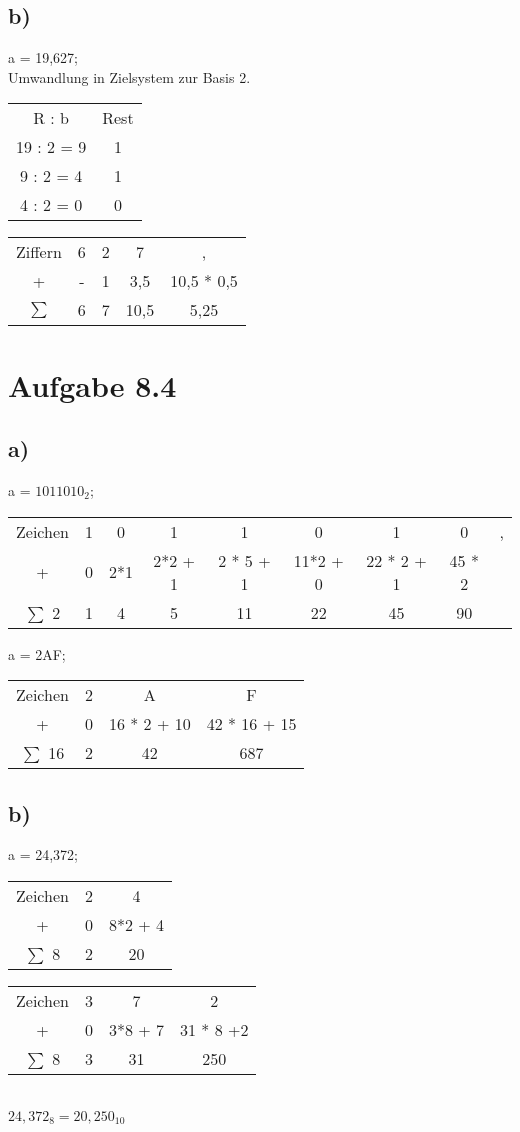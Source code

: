 \documentclass{article}
\begin{document}
	\subsection*{b)}
	a = 19,627; \\
	Umwandlung in Zielsystem zur Basis 2. \\
	\begin{tabular}[h]{c|c}
		R : b & Rest \\
		19 : 2 = 9 & 1 \\
		9 : 2 = 4 & 1 \\
		4 : 2 = 0 & 0
	\end{tabular}
	\begin{tabular}[h]{c|c|c|c|c}
		Ziffern & 6 & 2 & 7 & , \\
		+ & - & 1 & 3,5& 10,5 * 0,5   \\
		$\sum$  & 6 & 7 & 10,5 & 5,25
	\end{tabular}
	\section*{Aufgabe 8.4}
	\subsection*{a)}
	a = $1011010_2$; \\
	\begin{tabular}[h]{c|c|c|c|c|c|c|c|c}
		Zeichen & 1 & 0 & 1 & 1 & 0 & 1 & 0 & ,\\
		+ & 0 & 2*1 & 2*2 +  1 & 2 * 5 + 1 & 11*2 + 0 & 22 * 2 + 1 & 45 * 2\\
		$\sum$ 2 & 1 & 4 & 5 &  11 & 22 & 45 & 90
	\end{tabular}
	a = 2AF; \\
	\begin{tabular}[h]{c|c|c|c}
	Zeichen & 2 & A & F \\
	+ & 0 & 16 * 2 + 10 & 42 * 16 + 15 \\
	$\sum$ 16 & 2 & 42 & 687
	\end{tabular}
	\subsection*{b)}
	a = 24,372; \\
	\begin{tabular}[h]{c|c|c}
		Zeichen & 2 &  4 \\
		+ & 0  & 8*2 + 4 \\
		$\sum$ 8 & 2 & 20
	\end{tabular}
	\begin{tabular}[h]{c|c|c|c}
		Zeichen & 3 &  7 & 2 \\
		+ & 0  &3*8 + 7 & 31 * 8 +2  \\
		$\sum$ 8 & 3 & 31 & 250
	\end{tabular} \\
	$24,372_8 = 20,250_{10}$
\end{document}
